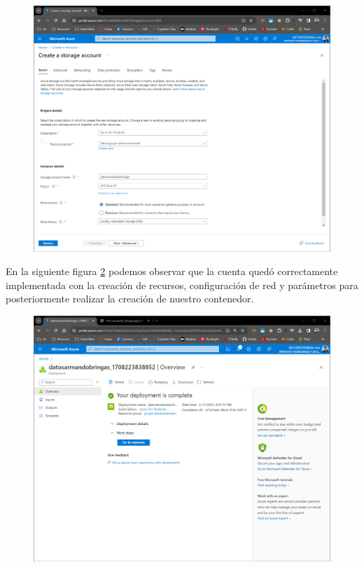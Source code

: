 \documentclass[12pt,a4paper]{article}
\begin{document}
\begin{figure}[H]
    \centering
    \includegraphics[width=1\linewidth]{M4_Servicios_Cómputo_en_la_Nube/Tarea_4_Crear_contenedores_en_la_nube/reporte/1-0_Creación_cuenta_storage.png}
    \label{fig:Azure_0}
\end{figure}

En la siguiente figura \ref{fig:Azure_1} podemos observar que la cuenta quedó correctamente implementada con la creación de recursos, configuración de red y parámetros para posteriormente realizar la creación de nuestro contenedor.

\begin{figure}[H]
    \centering
    \includegraphics[width=1\linewidth]{M4_Servicios_Cómputo_en_la_Nube/Tarea_4_Crear_contenedores_en_la_nube/reporte/1-1_Creación_cuenta_storage.png.png}
    \label{fig:Azure_1}
\end{figure}
\end{document}
